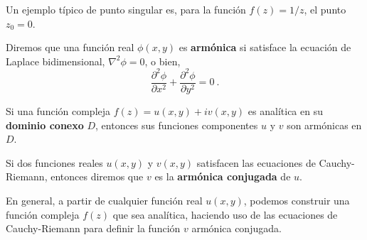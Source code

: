 Un ejemplo típico de punto singular es, para la función $f(z) = 1/z$, el punto $z_0 = 0$.

\begin{defi}
    Diremos que una función real $\phi(x,y)$ es \textbf{armónica} si satisface la ecuación de Laplace bidimensional, $\nabla^2 \phi = 0$, o bien,
    \begin{equation}
        \frac{\partial^2 \phi}{\partial x^2} + \frac{\partial^2 \phi}{\partial y^2} = 0 \ .
    \end{equation}
\end{defi}

\begin{teorema}
    Si una función compleja $f(z) = u(x,y) + i v(x,y)$ es analítica en su \textbf{dominio conexo} $D$, entonces sus funciones componentes $u$ y $v$ son armónicas en $D$.
\end{teorema}

\begin{defi}
    Si dos funciones reales $u(x,y)$ y $v(x,y)$ satisfacen las ecuaciones de Cauchy-Riemann, entonces diremos que $v$ es la \textbf{armónica conjugada} de $u$.
\end{defi}

En general, a partir de cualquier función real $u(x,y)$, podemos construir una función compleja $f(z)$ que sea analítica, haciendo uso de las ecuaciones de Cauchy-Riemann para definir la función $v$ armónica conjugada.

